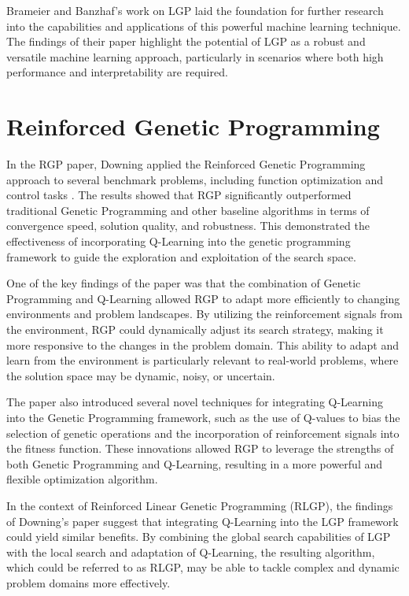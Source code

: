 \documentclass[12pt, final]{dalcsthesis}
\begin{document}
Brameier and Banzhaf's work on LGP laid the foundation for further research into the capabilities and applications of this powerful machine learning technique. The findings of their paper highlight the potential of LGP as a robust and versatile machine learning approach, particularly in scenarios where both high performance and interpretability are required.

\section{Reinforced Genetic Programming}
In the RGP paper, Downing applied the Reinforced Genetic Programming approach to several benchmark problems, including function optimization and control tasks \cite{downing1995reinforced}. The results showed that RGP significantly outperformed traditional Genetic Programming and other baseline algorithms in terms of convergence speed, solution quality, and robustness. This demonstrated the effectiveness of incorporating Q-Learning into the genetic programming framework to guide the exploration and exploitation of the search space.

One of the key findings of the paper was that the combination of Genetic Programming and Q-Learning allowed RGP to adapt more efficiently to changing environments and problem landscapes. By utilizing the reinforcement signals from the environment, RGP could dynamically adjust its search strategy, making it more responsive to the changes in the problem domain. This ability to adapt and learn from the environment is particularly relevant to real-world problems, where the solution space may be dynamic, noisy, or uncertain.

The paper also introduced several novel techniques for integrating Q-Learning into the Genetic Programming framework, such as the use of Q-values to bias the selection of genetic operations and the incorporation of reinforcement signals into the fitness function. These innovations allowed RGP to leverage the strengths of both Genetic Programming and Q-Learning, resulting in a more powerful and flexible optimization algorithm.

In the context of Reinforced Linear Genetic Programming (RLGP), the findings of Downing's paper suggest that integrating Q-Learning into the LGP framework could yield similar benefits. By combining the global search capabilities of LGP with the local search and adaptation of Q-Learning, the resulting algorithm, which could be referred to as RLGP, may be able to tackle complex and dynamic problem domains more effectively.
\end{document}

